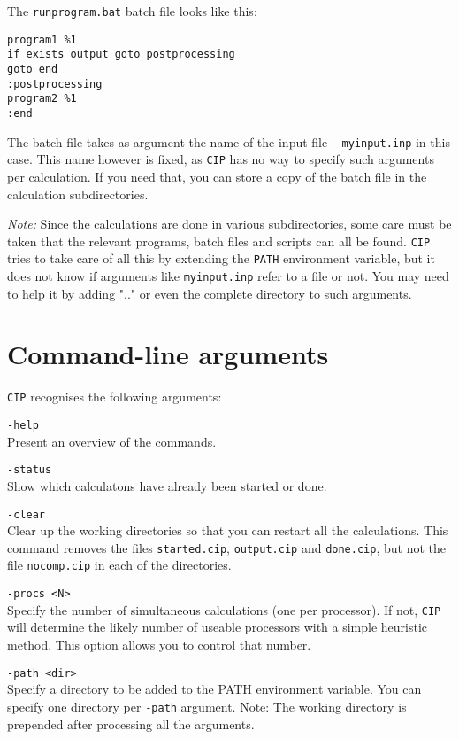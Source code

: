 \documentclass[onecolumn]{article}
\begin{document}
The \verb+runprogram.bat+ batch file looks like this:
\begin{verbatim}
program1 %1
if exists output goto postprocessing
goto end
:postprocessing
program2 %1
:end
\end{verbatim}

The batch file takes as argument the name of the input file --
\verb+myinput.inp+ in this case. This name however is fixed, as
\verb+CIP+ has no way to specify such arguments per calculation. If
you need that, you can store a copy of the batch file in the
calculation subdirectories.

\emph{Note:} Since the calculations are done in various subdirectories,
some care must be taken that the relevant programs, batch files and
scripts can all be found. \verb+CIP+ tries to take care of all this by
extending the \verb+PATH+ environment variable, but it does not know
if arguments like \verb+myinput.inp+ refer to a file or not. You may
need to help it by adding ".." or even the complete directory to such
arguments.


\section{Command-line arguments}
\verb+CIP+ recognises the following arguments:

\noindent \verb+-help+ \\
\indent Present an overview of the commands.

\noindent \verb+-status+ \\
\indent Show which calculatons have already been started or done.

\noindent \verb+-clear+ \\
\indent Clear up the working directories so that you can restart all
the calculations. This command removes the files \verb+started.cip+,
\verb+output.cip+ and \verb+done.cip+, but not the file
\verb+nocomp.cip+ in each of the directories.

\noindent \verb+-procs <N>+ \\
\indent Specify the number of simultaneous calculations (one per
processor). If not, \verb+CIP+ will determine the likely number of
useable processors with a simple heuristic method. This option allows
you to control that number.

\noindent \verb+-path <dir>+ \\
\indent Specify a directory to be added to the PATH environment
variable. You can specify one directory per \verb+-path+ argument.
Note: The working directory is prepended after processing
all the arguments.
\end{document}
